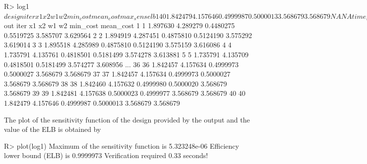 \begin{example}
R> log1$design
iter       x1       x2        w1        w2 min_cost mean_cost max_sens elb
1   40 1.842479 4.157646 0.4999987 0.5000013 3.568679  3.568679       NA  NA
time_sec
1       NA
R> log1$out
iter       x1       x2        w1        w2 min_cost mean_cost
1     1 1.897630 4.289279 0.4480275 0.5519725 3.585707  3.629564
2     2 1.894919 4.287451 0.4875810 0.5124190 3.575292  3.619014
3     3 1.895518 4.285989 0.4875810 0.5124190 3.575159  3.616086
4     4 1.735791 4.135761 0.4818501 0.5181499 3.574278  3.613881
5     5 1.735791 4.135709 0.4818501 0.5181499 3.574277  3.608956
...
36   36 1.842457 4.157634 0.4999973 0.5000027 3.568679  3.568679
37   37 1.842457 4.157634 0.4999973 0.5000027 3.568679  3.568679
38   38 1.842460 4.157632 0.4999980 0.5000020 3.568679  3.568679
39   39 1.842481 4.157638 0.5000023 0.4999977 3.568679  3.568679
40   40 1.842479 4.157646 0.4999987 0.5000013 3.568679  3.568679
\end{example}
The plot of the sensitivity function of the design provided by the output and the value of the ELB is obtained by
\begin{example}
R> plot(log1)
Maximum of the sensitivity function is  5.323248e-06
Efficiency lower bound (ELB) is  0.9999973
Verification required 0.33 seconds!
  \end{example}



